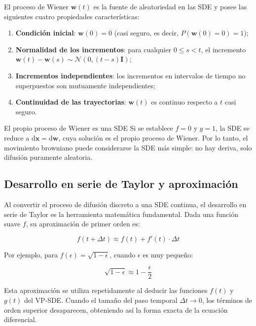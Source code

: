 El proceso de Wiener $\mathbf{w}(t)$ es la fuente de aleatoriedad en las SDE y posee las siguientes cuatro propiedades características:

\begin{enumerate}
    \item \textbf{Condición inicial}: $\mathbf{w}(0) = 0$ (casi seguro, es decir, $P(\mathbf{w}(0)=0) = 1$);
    \item \textbf{Normalidad de los incrementos}: para cualquier $0 \le s < t$, el incremento $\mathbf{w}(t) - \mathbf{w}(s) \sim \mathcal{N}(0, (t-s)\mathbf{I})$;
    \item \textbf{Incrementos independientes}: los incrementos en intervalos de tiempo no superpuestos son mutuamente independientes;
    \item \textbf{Continuidad de las trayectorias}: $\mathbf{w}(t)$ es continuo respecto a $t$ casi seguro.
\end{enumerate}

\begin{knowledgebox}{El propio proceso de Wiener es una SDE}
Si se establece $f = 0$ y $g = 1$, la SDE se reduce a $\mathrm{d}\mathbf{x} = \mathrm{d}\mathbf{w}$, cuya solución es el propio proceso de Wiener. Por lo tanto, el movimiento browniano puede considerarse la SDE más simple: no hay deriva, solo difusión puramente aleatoria.
\end{knowledgebox}

\subsection{Desarrollo en serie de Taylor y aproximación}

Al convertir el proceso de difusión discreto a una SDE continua, el desarrollo en serie de Taylor es la herramienta matemática fundamental. Dada una función suave $f$, su aproximación de primer orden es:

$$
f(t + \Delta t) \approx f(t) + f'(t) \cdot \Delta t
$$

Por ejemplo, para $f(\epsilon) = \sqrt{1 - \epsilon}$, cuando $\epsilon$ es muy pequeño:

$$
\sqrt{1 - \epsilon} \approx 1 - \frac{\epsilon}{2}
$$

Esta aproximación se utiliza repetidamente al deducir las funciones $f(t)$ y $g(t)$ del VP-SDE. Cuando el tamaño del paso temporal $\Delta t \to 0$, los términos de orden superior desaparecen, obteniendo así la forma exacta de la ecuación diferencial.

